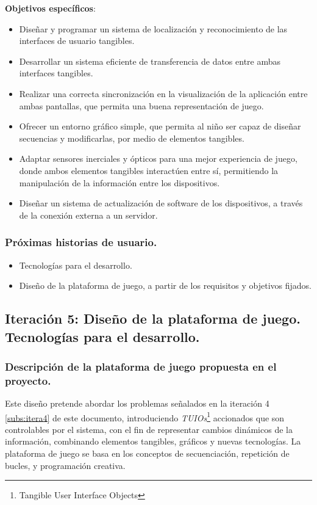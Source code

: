 \textbf{Objetivos específicos}:
\begin{itemize}
\item Diseñar y programar un sistema de localización y reconocimiento de las interfaces de usuario tangibles.

\item Desarrollar un sistema eficiente de transferencia de datos entre ambas interfaces tangibles.

\item Realizar una correcta sincronización en la visualización de la aplicación entre ambas pantallas, que permita una buena representación de juego.

\item Ofrecer un entorno gráfico simple, que permita al niño ser capaz de diseñar secuencias y modificarlas, por medio de elementos tangibles.

\item Adaptar sensores inerciales y ópticos para una mejor experiencia de juego, donde ambos elementos tangibles interactúen entre sí, permitiendo la manipulación de la información entre los dispositivos.

\item Diseñar un sistema de actualización de software de los dispositivos, a través de la conexión externa a un servidor.
\end{itemize}


\subsubsection{Próximas historias de usuario.}
\begin{itemize}
\item Tecnologías para el desarrollo.
\item Diseño de la plataforma de juego, a partir de los requisitos y objetivos fijados.
\end{itemize}



\subsection{Iteración 5: Diseño de la plataforma de juego. Tecnologías para el desarrollo. }

\subsubsection{Descripción de la plataforma de juego propuesta en el proyecto.}
Este diseño pretende abordar los problemas señalados en la iteración 4 \ref{subs:itera4} de este documento, introduciendo \emph{TUIOs}\footnote{Tangible User Interface Objects} accionados que son controlables por el sistema, con el fin de representar cambios dinámicos de la información, combinando elementos tangibles, gráficos y nuevas tecnologías. La plataforma de juego se basa en los conceptos de secuenciación, repetición de bucles, y programación creativa.


